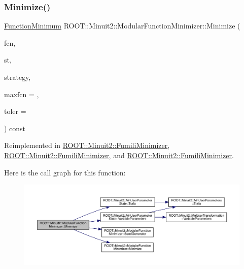 \subsubsection{\texorpdfstring{Minimize()}{Minimize()}\hspace{0.1cm}{\footnotesize\ttfamily [25/33]}}
{\footnotesize\ttfamily \mbox{\hyperlink{classROOT_1_1Minuit2_1_1FunctionMinimum}{Function\+Minimum}} R\+O\+O\+T\+::\+Minuit2\+::\+Modular\+Function\+Minimizer\+::\+Minimize (\begin{DoxyParamCaption}\item[{const \mbox{\hyperlink{classROOT_1_1Minuit2_1_1FCNBase}{F\+C\+N\+Base}} \&}]{fcn,  }\item[{const \mbox{\hyperlink{classROOT_1_1Minuit2_1_1MnUserParameterState}{Mn\+User\+Parameter\+State}} \&}]{st,  }\item[{const \mbox{\hyperlink{classROOT_1_1Minuit2_1_1MnStrategy}{Mn\+Strategy}} \&}]{strategy,  }\item[{unsigned int}]{maxfcn = {},  }\item[{double}]{toler = {} }\end{DoxyParamCaption}) const\hspace{0.3cm}{\ttfamily [virtual]}}



Reimplemented in \mbox{\hyperlink{classROOT_1_1Minuit2_1_1FumiliMinimizer_a3da0ec7b2ba7f876809f72d2f3054eec}{R\+O\+O\+T\+::\+Minuit2\+::\+Fumili\+Minimizer}}, \mbox{\hyperlink{classROOT_1_1Minuit2_1_1FumiliMinimizer_a3da0ec7b2ba7f876809f72d2f3054eec}{R\+O\+O\+T\+::\+Minuit2\+::\+Fumili\+Minimizer}}, and \mbox{\hyperlink{classROOT_1_1Minuit2_1_1FumiliMinimizer_a3da0ec7b2ba7f876809f72d2f3054eec}{R\+O\+O\+T\+::\+Minuit2\+::\+Fumili\+Minimizer}}.

Here is the call graph for this function\+:
\nopagebreak
\begin{figure}[H]
\begin{center}
\leavevmode
\includegraphics[width=350pt]{d3/dc8/classROOT_1_1Minuit2_1_1ModularFunctionMinimizer_a1ae6ed90bc87c3db98388f3d26980a51_cgraph}
\end{center}
\end{figure}
\mbox{\label{classROOT_1_1Minuit2_1_1ModularFunctionMinimizer_ad001dbb0a2d17022eb0818b4eddc2af9}} 
